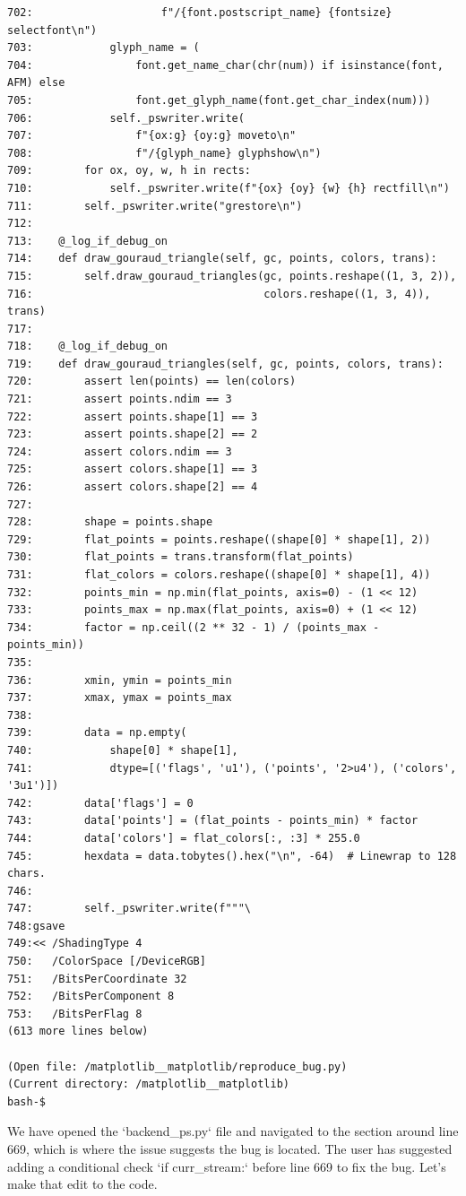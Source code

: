 {\begin{observationbox}
\begin{Verbatim}[breaklines=true, breakanywhere=true]
702:                    f"/{font.postscript_name} {fontsize} selectfont\n")
703:            glyph_name = (
704:                font.get_name_char(chr(num)) if isinstance(font, AFM) else
705:                font.get_glyph_name(font.get_char_index(num)))
706:            self._pswriter.write(
707:                f"{ox:g} {oy:g} moveto\n"
708:                f"/{glyph_name} glyphshow\n")
709:        for ox, oy, w, h in rects:
710:            self._pswriter.write(f"{ox} {oy} {w} {h} rectfill\n")
711:        self._pswriter.write("grestore\n")
712:
713:    @_log_if_debug_on
714:    def draw_gouraud_triangle(self, gc, points, colors, trans):
715:        self.draw_gouraud_triangles(gc, points.reshape((1, 3, 2)),
716:                                    colors.reshape((1, 3, 4)), trans)
717:
718:    @_log_if_debug_on
719:    def draw_gouraud_triangles(self, gc, points, colors, trans):
720:        assert len(points) == len(colors)
721:        assert points.ndim == 3
722:        assert points.shape[1] == 3
723:        assert points.shape[2] == 2
724:        assert colors.ndim == 3
725:        assert colors.shape[1] == 3
726:        assert colors.shape[2] == 4
727:
728:        shape = points.shape
729:        flat_points = points.reshape((shape[0] * shape[1], 2))
730:        flat_points = trans.transform(flat_points)
731:        flat_colors = colors.reshape((shape[0] * shape[1], 4))
732:        points_min = np.min(flat_points, axis=0) - (1 << 12)
733:        points_max = np.max(flat_points, axis=0) + (1 << 12)
734:        factor = np.ceil((2 ** 32 - 1) / (points_max - points_min))
735:
736:        xmin, ymin = points_min
737:        xmax, ymax = points_max
738:
739:        data = np.empty(
740:            shape[0] * shape[1],
741:            dtype=[('flags', 'u1'), ('points', '2>u4'), ('colors', '3u1')])
742:        data['flags'] = 0
743:        data['points'] = (flat_points - points_min) * factor
744:        data['colors'] = flat_colors[:, :3] * 255.0
745:        hexdata = data.tobytes().hex("\n", -64)  # Linewrap to 128 chars.
746:
747:        self._pswriter.write(f"""\
748:gsave
749:<< /ShadingType 4
750:   /ColorSpace [/DeviceRGB]
751:   /BitsPerCoordinate 32
752:   /BitsPerComponent 8
753:   /BitsPerFlag 8
(613 more lines below)

(Open file: /matplotlib__matplotlib/reproduce_bug.py)
(Current directory: /matplotlib__matplotlib)
bash-$
\end{Verbatim}
\end{observationbox}
\begin{agentbox}
We have opened the `backend\_ps.py` file and navigated to the section around line 669, which is where the issue suggests the bug is located. The user has suggested adding a conditional check `if curr\_stream:` before line 669 to fix the bug. Let's make that edit to the code.


\end{agentbox}}
